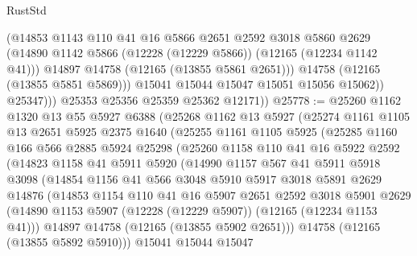 \begin{lexlean}{RustStd}
\begin{coremodule}
                    (@14853
                      @1143
                      @110
                      @41
                      @16
                      @5866
                      @2651
                      @2592
                      @3018
                      @5860
                      @2629
                      (@14890 @1142 @5866 (@12228 (@12229 @5866)) (@12165 (@12234 @1142 @41)))
                      @14897
                      @14758
                      (@12165 (@13855 @5861 @2651)))
                    @14758
                    (@12165 (@13855 @5851 @5869)))
                  @15041
                  @15044
                  @15047
                  @15051
                  @15056
                  @15062))
              @25347)))
        @25353
        @25356
        @25359
        @25362
        @12171))
@25778 := @25260
    @1162
    @1320
    @13
    @55
    @5927
    @6388
    (@25268
      @1162
      @13
      @5927
      (@25274
        @1161
        @1105
        @13
        @2651
        @5925
        @2375
        @1640
        (@25255
          @1161
          @1105
          @5925
          (@25285
            @1160
            @166
            @566
            @2885
            @5924
            @25298
            (@25260
              @1158
              @110
              @41
              @16
              @5922
              @2592
              (@14823
                @1158
                @41
                @5911
                @5920
                (@14990
                  @1157
                  @567
                  @41
                  @5911
                  @5918
                  @3098
                  (@14854
                    @1156
                    @41
                    @566
                    @3048
                    @5910
                    @5917
                    @3018
                    @5891
                    @2629
                    @14876
                    (@14853
                      @1154
                      @110
                      @41
                      @16
                      @5907
                      @2651
                      @2592
                      @3018
                      @5901
                      @2629
                      (@14890 @1153 @5907 (@12228 (@12229 @5907)) (@12165 (@12234 @1153 @41)))
                      @14897
                      @14758
                      (@12165 (@13855 @5902 @2651)))
                    @14758
                    (@12165 (@13855 @5892 @5910)))
                  @15041
                  @15044
                  @15047

\end{coremodule}
\end{lexlean}
